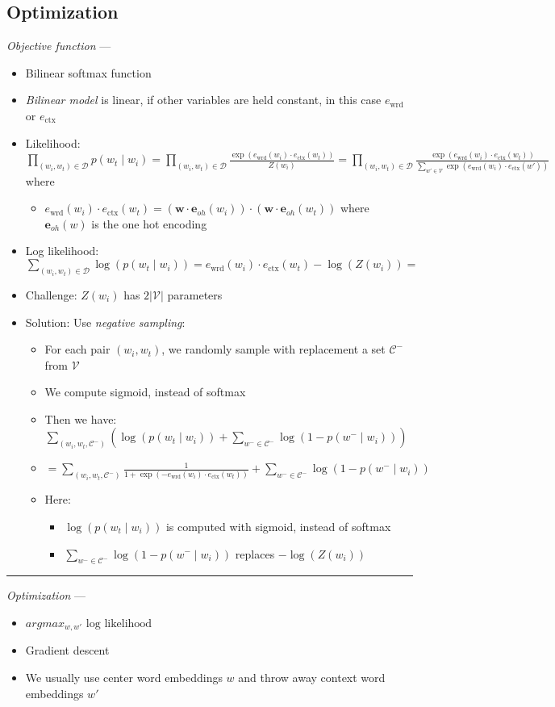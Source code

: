 \subsection*{Optimization}
\emph{Objective function} --- 
\begin{itemize}
    \item Bilinear softmax function
    \item \emph{Bilinear model} is linear, if other variables are held constant, in this case $e_\textrm{wrd}$ or $e_\textrm{ctx}$
    \item Likelihood:
    $
    \prod_{(w_i, w_t) \in \mathcal{D}} p(w_t \mid w_i) = \prod_{(w_i, w_t) \in \mathcal{D}} \frac{\exp\left(e_\textrm{wrd}(w_i) \cdot e_\textrm{ctx}(w_t)\right)}{Z(w_i)} = \prod_{(w_i, w_t) \in \mathcal{D}} \frac{\exp\left(e_\textrm{wrd}(w_i) \cdot e_\textrm{ctx}(w_t)\right)}{\sum_{w' \in \mathcal{V}} \exp\left(e_\textrm{wrd}(w_i) \cdot e_\textrm{ctx}(w')\right)}
    $ where
    \begin{itemize}
        \item $
        e_\textrm{wrd}(w_i) \cdot e_\textrm{ctx}(w_t) = (\boldsymbol{w} \cdot \boldsymbol{e}_{oh}(w_i)) \cdot (\boldsymbol{w} \cdot \boldsymbol{e}_{oh}(w_t))
        $ where $\boldsymbol{e}_{oh}(w)$ is the one hot encoding
    \end{itemize}
    \item Log likelihood: $\sum_{(w_i, w_t) \in \mathcal{D}} \log\left(p(w_t \mid w_i)\right) = e_\textrm{wrd}(w_i) \cdot e_\textrm{ctx}(w_t) - \log(Z(w_i)) = $
    \item Challenge: $Z(w_i)$ has $2|\mathcal{V}|$ parameters
    \item Solution: Use \emph{negative sampling}:
    \begin{itemize}
        \item For each pair $(w_i, w_t)$, we randomly sample with replacement a set $\mathcal{C}^-$ from $\mathcal{V}$
        \item We compute sigmoid, instead of softmax
        \item Then we have:
        $
        \sum_{(w_i, w_t, \mathcal{C}^-)} \left( \log(p(w_t \mid w_i)) + \sum_{w^- \in \mathcal{C}^-} \log(1 - p(w^- \mid w_i)) \right)
        $
        \item $
        = \sum_{(w_i, w_t, \mathcal{C}^-)} \frac{1}{1 + \exp\left(-e_\textrm{wrd}(w_i) \cdot e_\textrm{ctx}(w_t)\right)} + \sum_{w^- \in \mathcal{C}^-} \log(1 - p(w^- \mid w_i))
        $
        \item Here:
        \begin{itemize}
            \item $\log(p(w_t \mid w_i))$ is computed with sigmoid, instead of softmax
            \item $\sum_{w^- \in \mathcal{C}^-} \log(1 - p(w^- \mid w_i))$ replaces $- \log(Z(w_i))$
        \end{itemize}
    \end{itemize}
\end{itemize}

{\color{lightgray}\hrule height 0.001mm}

\emph{Optimization} ---
\begin{itemize}
    \item $argmax_{w,w'} \textrm{ log likelihood}$
    \item Gradient descent
    \item We usually use center word embeddings $w$ and throw away context word embeddings $w'$
\end{itemize}
